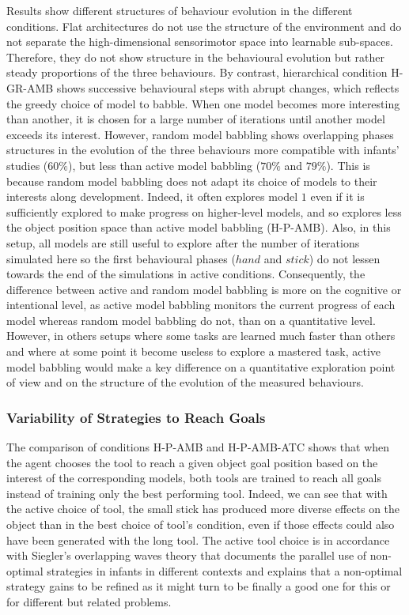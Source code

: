 \documentclass[10pt,letterpaper]{article}
\begin{document}
		Results show different structures of behaviour evolution in the different conditions.		
		Flat architectures do not use the structure of the environment and do not separate the high-dimensional sensorimotor space into learnable sub-spaces.
		Therefore, they do not show structure in the behavioural evolution but rather steady proportions of the three behaviours.
		By contrast, hierarchical condition H-GR-AMB shows successive behavioural steps with abrupt changes, which reflects the greedy choice of model to babble.
		When one model becomes more interesting than another, it is chosen
		for a large number of iterations until another model exceeds its interest.
		However, random model babbling shows overlapping phases structures in the evolution of the three behaviours more compatible with infants' studies ($60\%$), 
		but less than active model babbling ($70\%$ and $79\%$).
		This is because random model babbling does not adapt its choice of models to their interests along development.
		Indeed, it often explores model $1$ even if it is sufficiently explored to make progress on higher-level models, 
		and so explores less the object position space than active model babbling (H-P-AMB).
		Also, in this setup, all models are still useful to explore after the number of iterations simulated 
		here so the first behavioural phases ($hand$ and $stick$) do not lessen towards the end of the simulations in active conditions. 
		Consequently, the difference between active and random model babbling is more on the cognitive or intentional level, 
		as active model babbling monitors the current progress of each model whereas random model babbling do not, than on a quantitative level.
		However, in others setups where some tasks are learned much faster than others and where at some point it become useless to explore a mastered task, active model babbling would
		make a key difference on a quantitative exploration point of view and on the structure of the evolution of the measured behaviours.\\
	
	
	\subsubsection{Variability of Strategies to Reach Goals}
	
		The comparison of conditions H-P-AMB and H-P-AMB-ATC shows that when the agent chooses the tool to reach a given object goal position based on the interest of the corresponding models,
		both tools are trained to reach all goals instead of training only the best performing tool.
		Indeed, we can see that with the active choice of tool, the small stick has produced more diverse effects on the object than in the best choice of tool's condition, even if those effects could also have been 
		generated with the long tool.
		The active tool choice is in accordance with Siegler's overlapping waves theory that documents the parallel use of non-optimal strategies in infants in different contexts
		and explains that a non-optimal strategy gains to be refined as it might turn to be finally a good one for this or for different but related problems.
		
\end{document}
